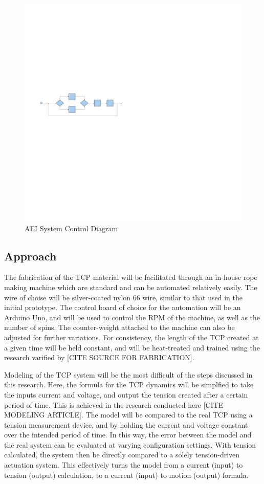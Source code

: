 \begin{figure}[ht]
	\centering
	\includegraphics[scale=0.30]{control_diagram}
	\caption{AEI System Control Diagram}
	\label{fig:control_diagram}
\end{figure}

\subsection{Approach}

The fabrication of the TCP material will be facilitated through an in-house rope making machine which are standard and can be automated relatively easily. The wire of choise will be silver-coated nylon 66 wire, similar to that used in the initial prototype. The control board of choice for the automation will be an Arduino Uno, and will be used to control the RPM of the machine, as well as the number of spins. The counter-weight attached to the machine can also be adjusted for further variations. For consistency, the length of the TCP created at a given time will be held constant, and will be heat-treated and trained using the research varified by [CITE SOURCE FOR FABRICATION].

Modeling of the TCP system will be the most difficult of the steps discussed in this research. Here, the formula for the TCP dynamics will be simplfied to take the inputs current and voltage, and output the tension created after a certain period of time. This is achieved in the research conducted here [CITE MODELING ARTICLE]. The model will be compared to the real TCP using a tension measurement device, and by holding the current and voltage constant over the intended period of time. In this way, the error between the model and the real system can be evaluated at varying configuration settings. With tension calculated, the system then be directly compared to a solely tension-driven actuation system. This effectively turns the model from a current (input) to tension (output) calculation, to a current (input) to motion (output) formula.

